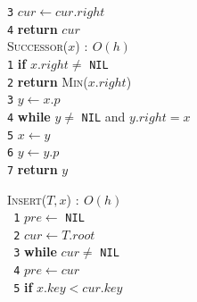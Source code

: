 \documentclass[10pt,landscape]{article}
\begin{document}
\begin{multicols*}{4}
\begin{multicols}{2}
                        \verb|3|\hspace*{1.5em} $cur \leftarrow cur.right$\\
                        \verb|4|\hspace*{0.5em} \textbf{return} $cur$\\
                        \columnbreak
                        \textsc{Successor($x$)} $:\ O(h)$\\ [3pt]
                        \verb|1|\hspace*{0.5em} \textbf{if} $x.right \neq$ \verb|NIL|\\
                        \verb|2|\hspace*{1.5em} \textbf{return} \textsc{Min}($x.right$)\\
                        \verb|3|\hspace*{0.5em} $y \leftarrow x.p$\\
                        \verb|4|\hspace*{0.5em} \textbf{while} $y \neq$ \verb|NIL| and $y.right=x$\\
                        \verb|5|\hspace*{1.5em} $x \leftarrow y$\\
                        \verb|6|\hspace*{1.5em} $y \leftarrow y.p$\\
                        \verb|7|\hspace*{0.5em} \textbf{return} $y$\\
                \end{multicols}
                \begin{multicols}{2}
                        \textsc{Insert($T,x$)} $:\ O(h)$\\ [3pt]
                        \verb| 1|\hspace*{0.5em} $pre \leftarrow$ \verb|NIL|\\
                        \verb| 2|\hspace*{0.5em} $cur \leftarrow T.root$\\
                        \verb| 3|\hspace*{0.5em} \textbf{while} $cur \neq$ \verb|NIL|\\
                        \verb| 4|\hspace*{1.5em} $pre \leftarrow cur$\\
                        \verb| 5|\hspace*{1.5em} \textbf{if} $x.key < cur.key$\\

\end{multicols}
\end{multicols*}
\end{document}

